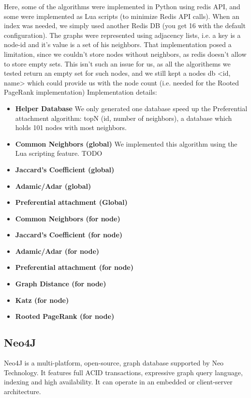 Here, some of the algorithms were implemented in Python using redis API, and
some were implemented as Lua scripts (to minimize Redis API calls). When an
index was needed, we simply used another Redis DB (you get 16 with the default
configuration). 
The graphs were represented using adjacency lists, i.e. a key is a node-id and
it's value is a set of his neighbors. That implementation posed a limitation,
since we couldn't store nodes without neighbors, as redis doesn't allow to
store empty sets. This isn't such an issue for us, as all the algorithems we tested
return an empty set for such nodes, and we still kept a nodes db <id, name> which
could provide us with the node count (i.e. needed for the Rooted PageRank implementation)
\linebreak
Implementation details:
\begin{itemize}
	\item {\bf Helper Database} 
        We only generated one database speed up the Preferential attachment algorithm:
	    topN (id, number of neighbors), a database which holds 101 nodes with most neighbors.
	\item {\bf Common Neighbors (global)} 
        We implemented this algorithm using the Lua scripting feature. TODO
	\item {\bf Jaccard's Coefficient (global)} 
	\item {\bf Adamic/Adar (global)} 
	\item {\bf Preferential attachment (Global)}
	\item {\bf Common Neighbors (for node)}
	\item {\bf Jaccard's Coefficient (for node)}
	\item {\bf Adamic/Adar (for node)}
	\item {\bf Preferential attachment (for node)}
	\item {\bf Graph Distance (for node)}
	\item {\bf Katz (for node)}
	\item {\bf Rooted PageRank (for node)}
\end{itemize}

\subsection{Neo4J}
Neo4J is a multi-platform, open-source, graph database supported by Neo
Technology. It features full ACID transactions, expressive graph query
language, indexing and high availability. It can operate in an embedded or
client-server architecture. 

